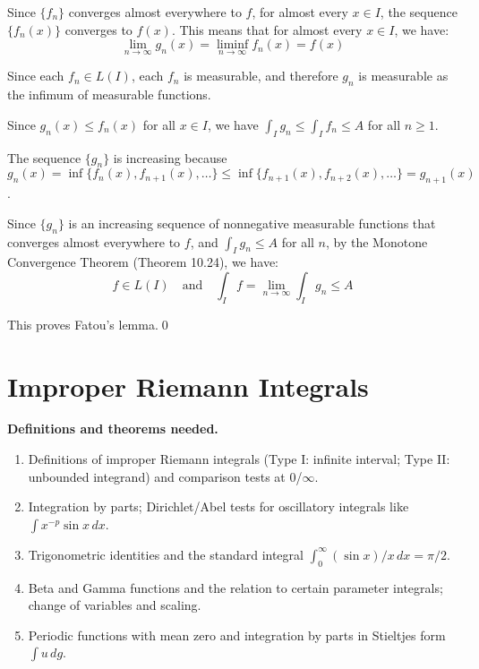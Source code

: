 Since $\{f_n\}$ converges almost everywhere to $f$, for almost every $x \in I$, the sequence $\{f_n(x)\}$ converges to $f(x)$. This means that for almost every $x \in I$, we have:
\[\lim_{n \to \infty} g_n(x) = \liminf_{n \to \infty} f_n(x) = f(x)\]

Since each $f_n \in L(I)$, each $f_n$ is measurable, and therefore $g_n$ is measurable as the infimum of measurable functions.

Since $g_n(x) \leq f_n(x)$ for all $x \in I$, we have $\int_I g_n \leq \int_I f_n \leq A$ for all $n \geq 1$.

The sequence $\{g_n\}$ is increasing because $g_n(x) = \inf \{f_n(x), f_{n+1}(x), \ldots\} \leq \inf \{f_{n+1}(x), f_{n+2}(x), \ldots\} = g_{n+1}(x)$.

Since $\{g_n\}$ is an increasing sequence of nonnegative measurable functions that converges almost everywhere to $f$, and $\int_I g_n \leq A$ for all $n$, by the Monotone Convergence Theorem (Theorem 10.24), we have:
\[f \in L(I) \quad \text{and} \quad \int_I f = \lim_{n \to \infty} \int_I g_n \leq A\]

This proves Fatou's lemma.\qed
\section{Improper Riemann Integrals}

\noindent\textbf{Definitions and theorems needed.}
\begin{enumerate}[label=(\alph*)]
    \item Definitions of improper Riemann integrals (Type I: infinite interval; Type II: unbounded integrand) and comparison tests at $0$/$\infty$.
    \item Integration by parts; Dirichlet/Abel tests for oscillatory integrals like $\int x^{-p}\sin x\,dx$.
    \item Trigonometric identities and the standard integral $\int_0^{\infty} (\sin x)/x\,dx=\pi/2$.
    \item Beta and Gamma functions and the relation to certain parameter integrals; change of variables and scaling.
    \item Periodic functions with mean zero and integration by parts in Stieltjes form $\int u\,dg$.
\end{enumerate}



